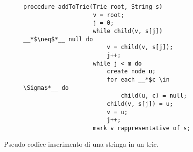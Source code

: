 \documentclass{subfiles}
\begin{document}
\begin{figure}[h!]
    \centering
    \begin{subfigure}[b]{.525\textwidth}
        \begin{lstlisting}[language = PSEUDO]
                procedure addToTrie(Trie root, String s)
                    v = root;
                    j = 0;
                    while child(v, s[j]) __*$\neq$*__ null do
                        v = child(v, s[j]);
                        j++;
                    while j < m do 
                        create node u;
                        for each __*$c \in \Sigma$*__ do 
                            child(u, c) = null;
                        child(v, s[j]) = u;
                        v = u;
                        j++;
                    mark v rappresentative of s;
            \end{lstlisting}
    \end{subfigure}
    \caption{Pseudo codice inserimento di una stringa in un trie.}
    \label{Fig:8}
\end{figure}
\end{document}
